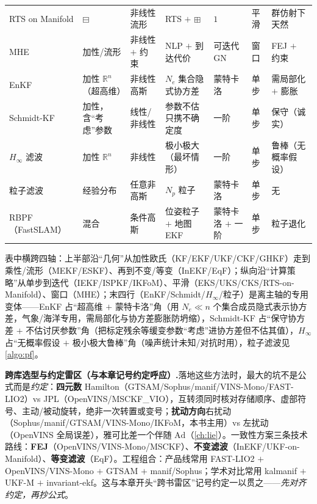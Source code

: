\begin{table}[H]
\begin{tabular}{lllllll}
RTS on Manifold & $\boxminus$ & 非线性流形 & RTS $+$ $\boxplus$ & $1$ & 平滑 & 群仿射下天然 \\
MHE & 加性/流形 & 非线性 $+$ 约束 & NLP $+$ 到达代价 & 可迭代 GN & 窗口 & FEJ $+$ 约束 \\
EnKF & 加性 $\mathbb{R}^n$（超高维） & 非线性高斯 & $N_e$ 集合隐式协方差 & 蒙特卡洛 & 单步 & 需局部化 $+$ 膨胀 \\
Schmidt-KF & 加性，含“考虑”参数 & 线性/非线性 & 参数不估只携不确定度 & 一阶 & 单步 & 保守（诚实） \\
$H_\infty$ 滤波 & 加性 $\mathbb{R}^n$ & 非线性 & 极小极大（最坏情形） & 一阶 & 单步 & 鲁棒（无概率假设） \\
粒子滤波 & 经验分布 & 任意非高斯 & $N_p$ 粒子 & 蒙特卡洛 & 单步 & 无 \\
RBPF（FastSLAM） & 混合 & 条件高斯 & 位姿粒子 $+$ 地图 EKF & 蒙特卡洛 $+$ 一阶 & 单步 & 粒子退化 \\
\bottomrule
\end{tabular}
\end{table}

\noindent 表中横跨四轴：上半部沿“几何”从加性欧氏（KF/EKF/UKF/CKF/GHKF）走到乘性/流形（MEKF/ESKF）、再到不变/等变（InEKF/EqF）；纵向沿“计算策略”从单步到迭代（IEKF/ISPKF/IKFoM）、平滑（EKS/UKS/CKS/RTS-on-Manifold）、窗口（MHE）；末四行（EnKF/Schmidt/$H_\infty$/粒子）是离主轴的专用变体——EnKF 占“超高维 $+$ 蒙特卡洛”角（用 $N_e\ll n$ 个集合成员隐式表示协方差，气象/海洋专用，需局部化与协方差膨胀防坍缩），Schmidt-KF 占“保守协方差 $+$ 不估讨厌参数”角（把标定残余等缓变参数“考虑”进协方差但不估其值），$H_\infty$ 占“无概率假设 $+$ 极小极大鲁棒”角（噪声统计未知/对抗时用），粒子滤波见 \cref{algo:pf}。

\begin{note}
\textbf{跨库选型与约定雷区（与本章记号约定呼应）.}\;落地这些方法时，最大的坑不是公式而是\emph{约定}\cite{sola2017quaternion}：\textbf{四元数} Hamilton（GTSAM/Sophus/manif/VINS-Mono/FAST-LIO2）vs JPL（OpenVINS/MSCKF\_VIO），互转须同时核对存储顺序、虚部符号、主动/被动旋转，绝非一次转置或变号；\textbf{扰动方向}右扰动（Sophus/manif/GTSAM/VINS-Mono/IKFoM，本书主用）vs 左扰动（OpenVINS 全局误差），雅可比差一个伴随 $\mathrm{Ad}$（\cref{ch:lie}）。一致性方案三条技术路线：\textbf{FEJ}（OpenVINS/VINS-Mono/MSCKF）、\textbf{不变滤波}（InEKF/UKF-on-Manifold）、\textbf{等变滤波}（EqF）。工程组合：产品线常用 FAST-LIO2 $+$ OpenVINS/VINS-Mono $+$ GTSAM $+$ manif/Sophus；学术对比常用 kalmanif $+$ UKF-M $+$ invariant-ekf。这与本章开头“跨书雷区”记号约定一以贯之——\emph{先对齐约定，再抄公式}。
\end{note}

